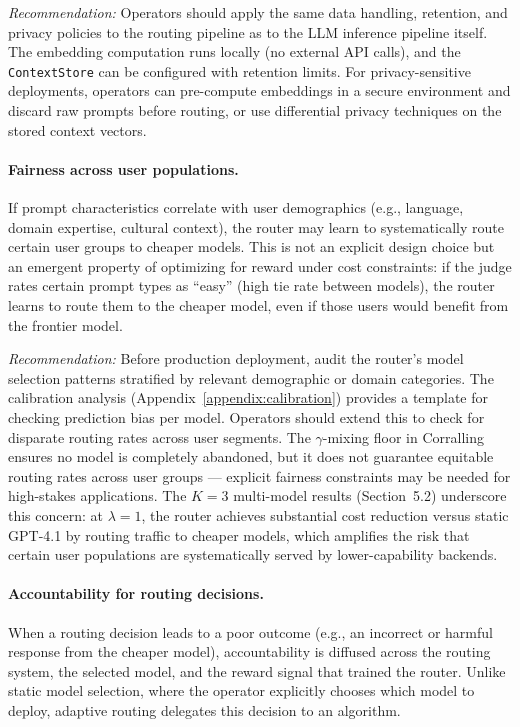 \emph{Recommendation:}  Operators should apply the same data handling,
retention, and privacy policies to the routing pipeline as to the LLM
inference pipeline itself.  The embedding computation runs locally (no
external API calls), and the \texttt{ContextStore} can be configured with
retention limits.  For privacy-sensitive deployments, operators can
pre-compute embeddings in a secure environment and discard raw prompts
before routing, or use differential privacy techniques on the stored
context vectors.

\paragraph{Fairness across user populations.}
If prompt characteristics correlate with user demographics (e.g., language,
domain expertise, cultural context), the router may learn to systematically
route certain user groups to cheaper models.  This is not an explicit design
choice but an emergent property of optimizing for reward under cost
constraints: if the judge rates certain prompt types as ``easy'' (high tie
rate between models), the router learns to route them to the cheaper model,
even if those users would benefit from the frontier model.

\emph{Recommendation:}  Before production deployment, audit the router's
model selection patterns stratified by relevant demographic or domain
categories.  The calibration analysis
(Appendix~\ref{appendix:calibration}) provides a template for checking
prediction bias per model.  Operators should extend this to check for
disparate routing rates across user segments.  The $\gamma$-mixing floor
in Corralling ensures no model is completely abandoned, but it does not
guarantee equitable routing rates across user groups --- explicit fairness
constraints may be needed for high-stakes applications.  The $K{=}3$
multi-model results (Section~5.2) underscore this concern: at
$\lambda{=}1$, the router achieves substantial cost reduction versus
static GPT-4.1 by routing traffic to cheaper
models, which amplifies the risk that certain user populations are
systematically served by lower-capability backends.

\paragraph{Accountability for routing decisions.}
When a routing decision leads to a poor outcome (e.g., an incorrect or
harmful response from the cheaper model), accountability is diffused across
the routing system, the selected model, and the reward signal that trained
the router.  Unlike static model selection, where the operator explicitly
chooses which model to deploy, adaptive routing delegates this decision to
an algorithm.

